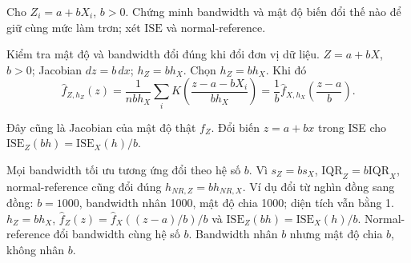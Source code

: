 \begin{problem}\label{k:50}
Cho $Z_i=a+bX_i$, $b>0$. Chứng minh bandwidth và mật độ biến đổi thế nào để giữ cùng mức làm trơn; xét $\mathrm{ISE}$ và normal-reference.
\end{problem}
\begin{solution}
Kiểm tra mật độ và bandwidth đổi đúng khi đổi đơn vị dữ liệu.
$Z=a+bX$, $b>0$; Jacobian $dz=b\,dx$; $h_Z=bh_X$.
Chọn $h_Z=bh_X$. Khi đó
\[
 \widehat f_{Z,h_Z}(z)=\frac1{nbh_X}\sum_iK\!\left(\frac{z-a-bX_i}{bh_X}\right)
 =\frac1b\widehat f_{X,h_X}\!\left(\frac{z-a}{b}\right).
\]

Đây cũng là Jacobian của mật độ thật $f_Z$. Đổi biến $z=a+bx$ trong ISE cho
$\mathrm{ISE}_Z(bh)=\mathrm{ISE}_X(h)/b$.

Mọi bandwidth tối ưu tương ứng đổi theo hệ số $b$. Vì $s_Z=bs_X$, $\mathrm{IQR}_Z=b\mathrm{IQR}_X$, normal-reference cũng đổi đúng $h_{NR,Z}=bh_{NR,X}$.
Ví dụ đổi từ nghìn đồng sang đồng: $b=1000$, bandwidth nhân 1000, mật độ chia 1000; diện tích vẫn bằng 1.
$h_Z=bh_X$, $\widehat f_Z(z)=\widehat f_X((z-a)/b)/b$ và $\mathrm{ISE}_Z(bh)=\mathrm{ISE}_X(h)/b$. Normal-reference đổi bandwidth cùng hệ số $b$.
Bandwidth nhân $b$ nhưng mật độ chia $b$, không nhân $b$.
\end{solution}

